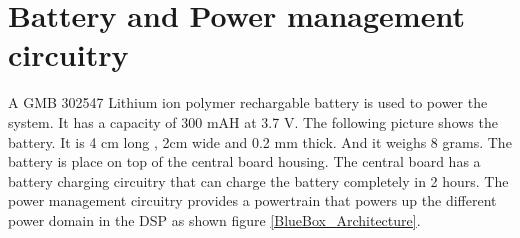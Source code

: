\section{Battery and Power management circuitry}
 A GMB 302547 Lithium ion polymer rechargable battery is used to power the system. It has a capacity of 300 mAH at 3.7 V. The following picture shows the battery. It is 4 cm long , 2cm wide and 0.2 mm thick. And it weighs  8 grams. The battery is place on top of the central board housing. The central board has a battery charging circuitry that can charge the battery completely in 2 hours. The power management circuitry provides a powertrain that powers up the different power domain in the DSP  as shown figure \ref{BlueBox_Architecture}.             
